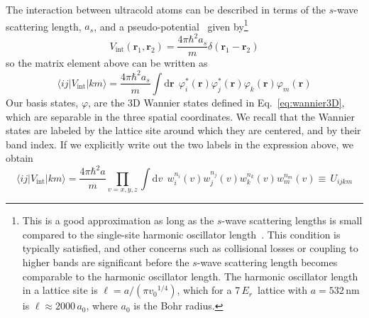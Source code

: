 \documentclass[oneside,11pt]{memoir}
\newcommand{\bv}[1]{\ensuremath{\bm{#1}}}
\newcommand{\vvo}{\ensuremath{v_{0}}}
\newcommand{\er}{\ensuremath{E_{r}}}
\begin{document}
The interaction between ultracold atoms can be described in terms of the
$s$-wave scattering length, $a_{s}$,  and a
pseudo-potential~\cite{sakurai2014modern,Bloch2008} given by\footnote{This is a
good approximation as long as the $s$-wave scattering lengths is small compared
to the single-site harmonic oscillator length~\cite{Busch1998}. This condition
is typically satisfied, and other concerns such as collisional losses or
coupling to higher bands are significant before the $s$-wave scattering length
becomes comparable to the harmonic oscillator length.  The harmonic oscillator
length in a lattice site is $\ell = a / (\pi \vvo^{1/4})$, which for a 7\,\er\
lattice with $a=532\,$nm is $\ell \approx 2000\,a_{0}$, where $a_{0}$ is the
Bohr radius.}
\begin{equation}
    V_{\mathrm{int}}(\bv{r}_{1},\bv{r}_{2}) 
    = \frac{ 4 \pi \hbar^{2} a_{s} } { m } \delta(\bv{r}_{1}-\bv{r}_{2}) 
\end{equation}
so the matrix element above can be written as 
\begin{equation}
    \langle ij | V_{\mathrm{int}} | km \rangle =
\frac{ 4 \pi \hbar^{2} a_{s} } { m }
    \int \mathrm{d}\bv{r}  \ \  \varphi_{i}^{*}(\bv{r}) \varphi_{j}^{*}(\bv{r}) \varphi_{k}(\bv{r}) \varphi_{m}(\bv{r}) 
\end{equation}
Our basis states, $\varphi$, are the 3D Wannier states defined in
Eq.~\ref{eq:wannier3D}, which are separable in the three spatial coordinates.
We recall that the Wannier states are labeled by the lattice site around which
they are centered, and by their band index.   If we explicitly write out the two
labels in the expression above, we obtain
\begin{equation}
    \langle ij | V_{\mathrm{int}} | km \rangle =
\frac{ 4 \pi \hbar^{2} a } { m }
  \prod_{v=x,y,z}
    \int \mathrm{d}v  \ \ 
    w_{i}^{n_{i}}(v) w_{j}^{n_{j}}(v) w_{k}^{n_{k}}(v) w_{m}^{n_{m}}(v) 
   \equiv \, U_{ijkm}
\end{equation}
\end{document}
